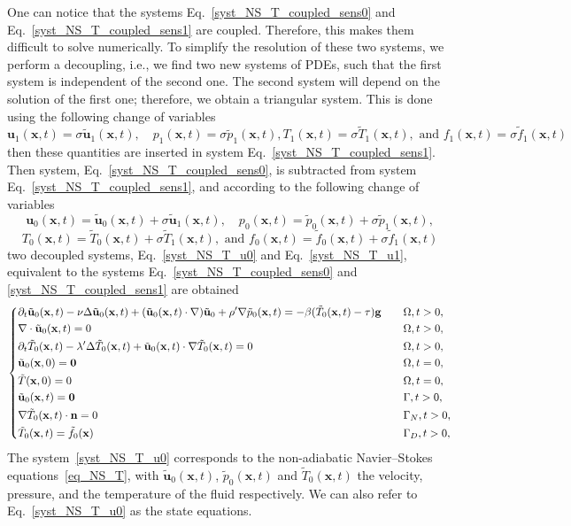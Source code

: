 One can notice that the systems Eq.~\eqref{syst_NS_T_coupled_sens0} and Eq.~\eqref{syst_NS_T_coupled_sens1} are coupled. Therefore, this makes them difficult to solve numerically. To simplify the resolution of these two systems, we perform a decoupling, i.e., we find two
new systems of PDEs, such that the first system is independent of the second one. The second system will depend on the solution of the first one; therefore, we obtain a triangular system. This is done using the following change of variables
 $$\mathbf{u}_1(\mathbf{x},t)=\sigma\tilde{\mathbf{u}}_1(\mathbf{x},t),\quad p_1(\mathbf{x},t)= \sigma \tilde p_1(\mathbf{x},t),  T_1(\mathbf{x},t)= \sigma \tilde T_1(\mathbf{x},t), \text{ and } f_1(\mathbf{x},t)= \sigma \tilde f_1(\mathbf{x},t)$$ 
 then these quantities are inserted in system Eq.~\eqref{syst_NS_T_coupled_sens1}. Then system, Eq.~\eqref{syst_NS_T_coupled_sens0}, is subtracted from system Eq.~\eqref{syst_NS_T_coupled_sens1}, and according to the following change of variables $$\mathbf{u}_0(\mathbf{x},t)=\tilde {\mathbf u}_0(\mathbf{x},t)+\sigma\tilde {\mathbf u}_1(\mathbf{x},t),\quad p_0(\mathbf{x},t)= \tilde p_0(\mathbf{x},t)+\sigma\tilde p_1(\mathbf{x},t),$$ $$T_0(\mathbf{x},t)=\tilde T_0(\mathbf{x},t)+\sigma\tilde T_1(\mathbf{x},t), \text{ and } f_0(\mathbf{x},t)= \tilde f_0(\mathbf{x},t)+\sigma\tilde f_1(\mathbf{x},t)$$ two decoupled systems, Eq.~\eqref{syst_NS_T_u0} and Eq.~\eqref{syst_NS_T_u1}, equivalent to the systems Eq.~\eqref{syst_NS_T_coupled_sens0} and \mathbf{}\eqref{syst_NS_T_coupled_sens1} are obtained
\begin{equation} 
\left\lbrace
\begin{aligned}
& \partial_t \tilde{\mathbf{u}}_0(\mathbf{x},t)-\nu\Delta \tilde{\mathbf{u}}_0(\mathbf{x},t)+(\tilde{\mathbf{u}}_0(\mathbf{x},t)\cdot \nabla)\tilde{\mathbf{u}}_0+\rho'\nabla \tilde p_0(\mathbf{x},t)=-\beta(\tilde T_0(\mathbf{x},t)-\tau)\mathbf g && \quad \Omega,t>0,\\
& \nabla\cdot\tilde{\mathbf{u}}_0(\mathbf{x},t)=0 && \quad \Omega,t>0,\\
 &\partial_t\tilde T_0(\mathbf{x},t)-\lambda'\Delta \tilde T_0(\mathbf{x},t) +\tilde{\mathbf{u}}_0(\mathbf{x},t)\cdot \nabla\tilde T_0(\mathbf{x},t)= 0 && \quad \Omega,t>0,\\
 & {\tilde{\mathbf{u}}}_0(\mathbf{x}, 0)= \mathbf{0} && \quad \Omega,t=0,\\
 & \tilde T(\mathbf{x}, 0)= 0 && \quad \Omega,t=0,\\
 & {\tilde{\mathbf{u}}}_0(\mathbf{x},t)=\mathbf{0} && \quad \Gamma,t>0,\\
 & \nabla \tilde{T}_0(\mathbf{x},t)\cdot \mathbf{n}=0 && \quad \Gamma_N,t>0,\\
 &\tilde{T}_0(\mathbf{x},t)=\textcolor{black}{\tilde f_0(\mathbf{x})} && \quad \Gamma_D,t>0,
\end{aligned}
\right.
\label{syst_NS_T_u0}
\end{equation}
The system~\eqref{syst_NS_T_u0} corresponds to the non-adiabatic Navier–Stokes equations~\eqref{eq_NS_T}, with $\tilde{\mathbf{u}}_0(\mathbf{x},t)$, $\tilde p_0(\mathbf{x},t)$ and  $\tilde T_0(\mathbf{x},t)$ the  velocity, pressure, and the temperature of the fluid respectively.  We can also refer to Eq.~\eqref{syst_NS_T_u0} as the state equations.

